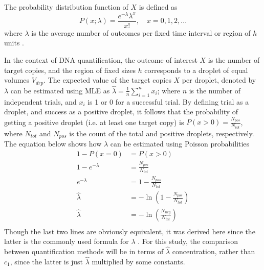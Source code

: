 The probability distribution function of \(X\) is defined as
\[
    P(x; \lambda) = \frac{e^{-\lambda}\lambda^{x}}{x!},\quad x = 0, 1, 2, ...
\]
where \(\lambda\) is the average number of outcomes per fixed time interval or region of \(h\) units \cite{Walpole2011}.

In the context of DNA quantification, the outcome of interest \(X\) is the number of target copies, and the region of fixed sizes \(h\) corresponds to a droplet of equal volumes \(V_{drp}\). The expected value of the target copies \(X\) per droplet, denoted by \(\lambda\) can be estimated using MLE as \(\hat{\lambda} = \frac{1}{n}\sum_{i=1}^{n}x_i\); where \(n\) is the number of independent trials, and \(x_i\) is 1 or 0 for a successful trial. By defining trial as a droplet, and success as a positive droplet, it follows that the probability of getting a positive droplet (i.e. at least one target copy) is \(P(x>0) = \frac{N_{pos}}{N_{tot}}\), where \(N_{tot}\) and \(N_{pos}\) is the count of the total and positive droplets, respectively. The equation below shows how \(\lambda\) can be estimated using Poisson probabilities 
\begin{equation}
    \begin{aligned}
        1-P(x=0) &= P(x>0)\\
        1-e^{-\lambda} &= \frac{N_{pos}}{N_{tot}}\\
        e^{-\lambda} &= 1-\frac{N_{pos}}{N_{tot}}\\
        \hat{\lambda} &= -\ln(1-\frac{N_{pos}}{N_{tot}})\\
        \hat{\lambda} &= -\ln(\frac{N_{neg}}{N_{tot}}) \label{eq:lambda} \\
    \end{aligned}
\end{equation}
Though the last two lines are obviously equivalent, it was derived here since the latter is the commonly used formula for \(\lambda\) \cite{Tzonev2018}. For this study, the comparison between quantification methods will be in terms of \(\hat{\lambda}\) concentration, rather than \(c_{1}\), since the latter is just \(\hat{\lambda}\) multiplied by some constants.


